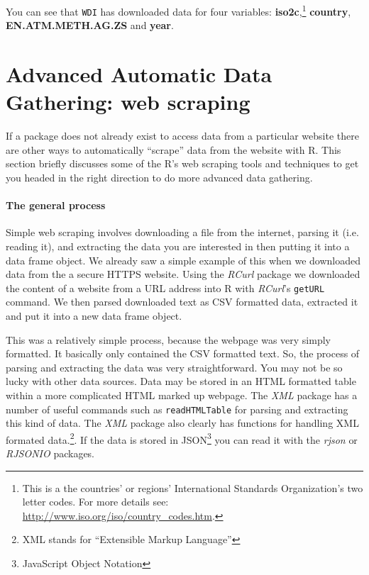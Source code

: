 \noindent You can see that \texttt{WDI} has downloaded data for four variables: \textbf{iso2c},\footnote{This is a the countries' or regions' International Standards Organization's two letter codes. For more details see: \url{http://www.iso.org/iso/country_codes.htm}.} \textbf{country}, \textbf{EN.ATM.METH.AG.ZS} and \textbf{year}.

\section{Advanced Automatic Data Gathering: web scraping}

If a package does not already exist to access data from a particular website there are other ways to automatically ``scrape'' data from the website with R. This section briefly discusses some of the R's web scraping tools and techniques to get you headed in the right direction to do more advanced data gathering.

\paragraph{The general process}

Simple web scraping involves downloading a file from the internet, parsing it (i.e. reading it), and extracting the data you are interested in then putting it into a data frame object. We already saw a simple example of this when we downloaded data from the a secure HTTPS website. Using the \emph{RCurl} package we downloaded the content of a website from a URL address into R with \emph{RCurl}'s \texttt{getURL} command. We then parsed downloaded text as CSV formatted data, extracted it and put it into a new data frame object. 

This was a relatively simple process, because the webpage was very simply formatted. It basically only contained the CSV formatted text. So, the process of parsing and extracting the data was very straightforward. You may not be so lucky with other data sources. Data may be stored in an HTML formatted table within a more complicated HTML marked up webpage. The \emph{XML} package  has a number of useful commands such as \texttt{readHTMLTable} for parsing and extracting this kind of data. The \emph{XML} package also clearly has functions for handling XML formated data.\footnote{XML stands for ``Extensible Markup Language''}. If the data is stored in JSON\footnote{JavaScript Object Notation} you can read it with the \emph{rjson} \citep{R-rjson} or \emph{RJSONIO} \citep{R-RJSONIO} packages.

